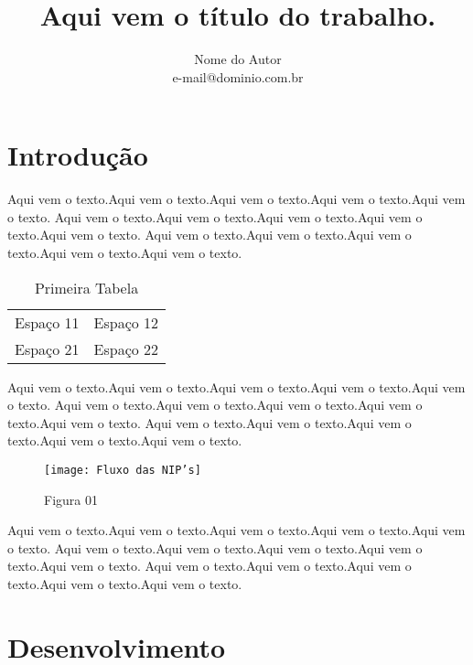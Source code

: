 \documentclass[a4paper]{article}
\title{Aqui vem o título do trabalho.}
\author{Nome do Autor \\ e-mail@dominio.com.br}
\begin{document}
\maketitle \newpage
\tableofcontents \newpage
\listoffigures \newpage
\listoftables \newpage

\section{Introdução}

	Aqui vem o texto.Aqui vem o texto.Aqui vem o texto.Aqui vem o texto.Aqui vem o texto.
	Aqui vem o texto.Aqui vem o texto.Aqui vem o texto.Aqui vem o texto.Aqui vem o texto.
	Aqui vem o texto.Aqui vem o texto.Aqui vem o texto.Aqui vem o texto.Aqui vem o texto.

\begin{table} [htb]

	\centering
	\begin{tabular}{|c|c|}
	
		Espaço 11 & Espaço 12 \\
		Espaço 21 & Espaço 22 \\
	
	\end{tabular}
	\caption{Primeira Tabela}
	\label{minha-tabela-01}

\end{table}

	Aqui vem o texto.Aqui vem o texto.Aqui vem o texto.Aqui vem o texto.Aqui vem o texto.
	Aqui vem o texto.Aqui vem o texto.Aqui vem o texto.Aqui vem o texto.Aqui vem o texto.
	Aqui vem o texto.Aqui vem o texto.Aqui vem o texto.Aqui vem o texto.Aqui vem o texto.

\begin{figure} [htb]

	\centering
	\texttt{[image: Fluxo das NIP's]}
	\caption{Figura 01} %
	\label{NIP's 01}

\end{figure}
	
	Aqui vem o texto.Aqui vem o texto.Aqui vem o texto.Aqui vem o texto.Aqui vem o texto.
	Aqui vem o texto.Aqui vem o texto.Aqui vem o texto.Aqui vem o texto.Aqui vem o texto.
	Aqui vem o texto.Aqui vem o texto.Aqui vem o texto.Aqui vem o texto.Aqui vem o texto.	
	
\newpage
\section{Desenvolvimento}
\end{document}
